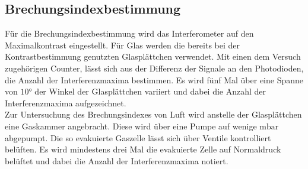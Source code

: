 \subsection{Brechungsindexbestimmung}
Für die Brechungsindexbestimmung wird das Interferometer auf den Maximalkontrast eingestellt. Für Glas werden die bereits bei der Kontrastbestimmung genutzten Glasplättchen verwendet.
Mit einen dem Versuch zugehörigen Counter, lässt sich aus der Differenz der Signale an den Photodioden, die Anzahl der Interferenzmaxima bestimmen. Es wird fünf Mal über eine Spanne von $10°$ der Winkel der Glasplättchen
variiert und dabei die Anzahl der Interferenzmaxima aufgezeichnet.\\
Zur Untersuchung des Brechungsindexes von Luft wird anstelle der Glasplättchen eine Gaskammer angebracht. Diese wird über eine Pumpe auf wenige $\si{\milli\bar}$ abgepumpt. Die so evakuierte Gaszelle lässt sich
über Ventile kontrolliert belüften. Es wird mindestens drei Mal die evakuierte Zelle auf Normaldruck belüftet und dabei die Anzahl der Interferenzmaxima notiert.
